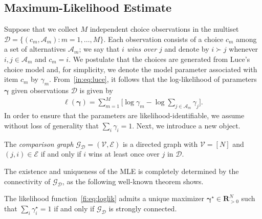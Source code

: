 \subsection{Maximum-Likelihood Estimate}
\label{fi:sec:mle}


Suppose that we collect $M$ independent choice observations in the multiset $\mathcal{D} = \{(c_m, \mathcal{A}_m) : m = 1, \ldots, M\}$.
Each observation consists of a choice $c_m$ among a set of alternatives $\mathcal{A}_m$;
we say that \emph{$i$ wins over $j$} and denote by $i \succ j$ whenever $i, j \in \mathcal{A}_m$ and $c_m = i$.
We postulate that the choices are generated from Luce's choice model and, for simplicity, we denote the model parameter associated with item $c_m$ by $\gamma_m$.
From~\eqref{in:eq:luce}, it follows that the log-likelihood of parameters $\bm{\gamma}$ given observations $\mathcal{D}$ is given by
\begin{align}
\label{fi:eq:loglik}
\ell(\bm{\gamma}) = \sum_{m = 1}^M \bigg[ \log \gamma_m - \log{\sum_{j \in \mathcal{A}_m} \gamma_j} \bigg].
\end{align}
In order to ensure that the parameters are likelihood-identifiable, we assume without loss of generality that $\sum_i \gamma_i = 1$.
Next, we introduce a new object.

\begin{definition}
The \emph{comparison graph} $\mathcal{G}_{\mathcal{D}} = (\mathcal{V}, \mathcal{E})$ is a directed graph with $\mathcal{V} = [N]$ and $(j, i) \in \mathcal{E}$ if and only if $i$ wins at least once over $j$ in $\mathcal{D}$.
\end{definition}

The existence and uniqueness of the MLE is completely determined by the connectivity of $\mathcal{G}_{\mathcal{D}}$, as the following well-known theorem shows.

\begin{theorem}
\label{fi:thm:mlboth}
The likelihood function~\eqref{fi:eq:loglik} admits a unique maximizer $\bm{\gamma}^\star \in \mathbf{R}^N_{>0}$ such that $\sum_i \gamma^\star_i = 1$ if and only if $\mathcal{G}_{\mathcal{D}}$ is strongly connected.
\end{theorem}

